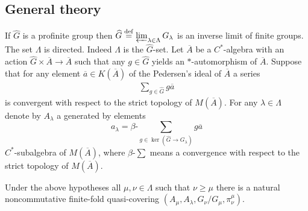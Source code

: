 \documentclass{beamer}
\theoremstyle{plain}
\newcommand{\be}{\begin{equation}}
\newcommand{\ee}{\end{equation}}
\newcommand{\la}{\lambda}
\newcommand{\La}{\Lambda}
\newcommand{\bt}{\beta}           %
\newcommand{\bean}{\begin{eqnarray*}}
\newcommand{\eean}{\end{eqnarray*}}
\newcommand{\bydef}{\stackrel{\mathrm{def}}{=}}
\begin{document}
\subsection{General theory}

\begin{frame}
 	If  $\widehat{G}$ is a profinite group   then 
$\widehat{G} \bydef \varprojlim_{\la \in \La}  G_\la$ is an inverse limit of finite groups. The set $\La$ is directed. Indeed $\La$ is the $\widehat{G}$-set. Let $\overline A$ be a $C^*$-algebra with an action $\widehat{G}\times \overline A\to \overline A$ such that any $ g \in \widehat G$ yields an $*$-automorphism of $\overline A$.	  
Suppose that for any element $\overline a \in K\left(\overline A \right)$ of the Pedersen's ideal of $\overline A$  a series 
\bean
\sum_{	g \in \widehat{G}}g \overline a
\eean
is convergent with respect to the strict topology of $M\left(\overline A\right)$.  For any $\la \in \La$ denote by $A_\la$ a generated by elements
\be\label{basic_cov_cl_eqn}
a_\la =\bt\text{-} \sum_{	g \in \ker\left( \widehat{G}\to G_\la\right) }g \overline a
\ee
$C^*$-subalgebra of $M\left(\overline A\right)$, where  $\bt\text{-} \sum$ means a convergence  with respect to the strict topology of $M\left(\overline A\right)$. 
\end{frame}
\begin{frame}
 \begin{lemma}\label{infinite_quasi_covering_lem}
	Under the above hypotheses  all $\mu, \nu \in \La$ such that $\nu\ge\mu$ there is a natural noncommutative finite-fold quasi-covering $\left(A_\mu, A_\la, G_\nu/ G_\mu, \pi^\mu_\nu\right)$.
\end{lemma}
\end{frame}
\end{document}
